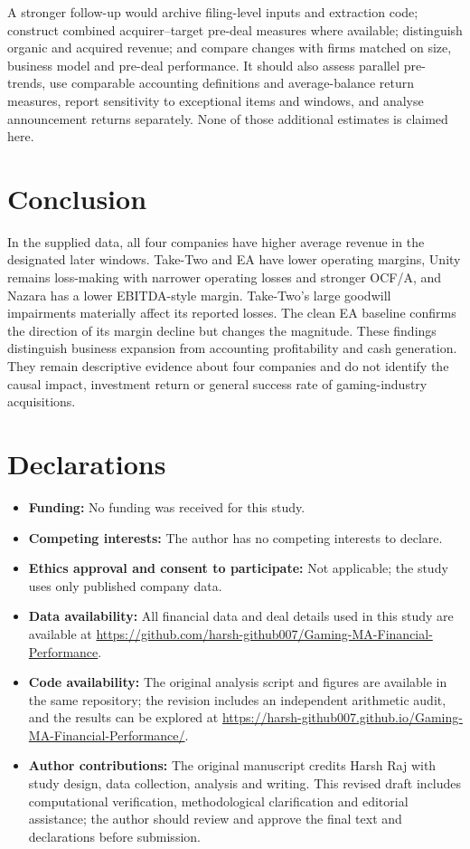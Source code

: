 \documentclass[11pt]{article}
\begin{document}
A stronger follow-up would archive filing-level inputs and extraction code; construct combined acquirer--target pre-deal measures where available; distinguish organic and acquired revenue; and compare changes with firms matched on size, business model and pre-deal performance. It should also assess parallel pre-trends, use comparable accounting definitions and average-balance return measures, report sensitivity to exceptional items and windows, and analyse announcement returns separately. None of those additional estimates is claimed here.

\section{Conclusion}\label{sec:conclusion}

In the supplied data, all four companies have higher average revenue in the designated later windows. Take-Two and EA have lower operating margins, Unity remains loss-making with narrower operating losses and stronger OCF/A, and Nazara has a lower EBITDA-style margin. Take-Two's large goodwill impairments materially affect its reported losses. The clean EA baseline confirms the direction of its margin decline but changes the magnitude. These findings distinguish business expansion from accounting profitability and cash generation. They remain descriptive evidence about four companies and do not identify the causal impact, investment return or general success rate of gaming-industry acquisitions.



\section*{Declarations}

\begin{itemize}
\item \textbf{Funding:} No funding was received for this study.
\item \textbf{Competing interests:} The author has no competing interests to declare.
\item \textbf{Ethics approval and consent to participate:} Not applicable; the study uses only published company data.
\item \textbf{Data availability:} All financial data and deal details used in this study are available at \url{https://github.com/harsh-github007/Gaming-MA-Financial-Performance}.
\item \textbf{Code availability:} The original analysis script and figures are available in the same repository; the revision includes an independent arithmetic audit, and the results can be explored at \url{https://harsh-github007.github.io/Gaming-MA-Financial-Performance/}.
\item \textbf{Author contributions:} The original manuscript credits Harsh Raj with study design, data collection, analysis and writing. This revised draft includes computational verification, methodological clarification and editorial assistance; the author should review and approve the final text and declarations before submission.
\end{itemize}
\end{document}
